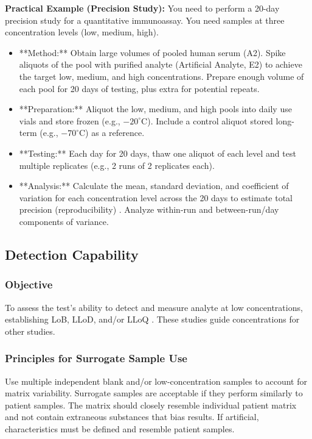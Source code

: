 \documentclass{article}
\begin{document}
\textbf{Practical Example (Precision Study):}
You need to perform a 20-day precision study for a quantitative immunoassay. You need samples at three concentration levels (low, medium, high).
\begin{itemize}
    \item **Method:** Obtain large volumes of pooled human serum (A2). Spike aliquots of the pool with purified analyte (Artificial Analyte, E2) to achieve the target low, medium, and high concentrations. Prepare enough volume of each pool for 20 days of testing, plus extra for potential repeats.
    \item **Preparation:** Aliquot the low, medium, and high pools into daily use vials and store frozen (e.g., $-20^\circ$C). Include a control aliquot stored long-term (e.g., $-70^\circ$C) as a reference.
    \item **Testing:** Each day for 20 days, thaw one aliquot of each level and test multiple replicates (e.g., 2 runs of 2 replicates each).
    \item **Analysis:** Calculate the mean, standard deviation, and coefficient of variation for each concentration level across the 20 days to estimate total precision (reproducibility) \cite{CLSIEP05}. Analyze within-run and between-run/day components of variance.
\end{itemize}

\subsection{Detection Capability}

\subsubsection{Objective}
To assess the test's ability to detect and measure analyte at low concentrations, establishing LoB, LLoD, and/or LLoQ \cite{CLSIEP17}. These studies guide concentrations for other studies.

\subsubsection{Principles for Surrogate Sample Use}
Use multiple independent blank and/or low-concentration samples to account for matrix variability. Surrogate samples are acceptable if they perform similarly to patient samples. The matrix should closely resemble individual patient matrix and not contain extraneous substances that bias results. If artificial, characteristics must be defined and resemble patient samples.
\end{document}
